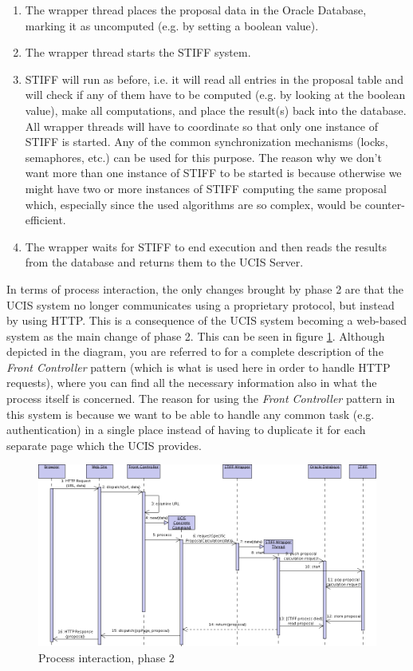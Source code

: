 \begin{enumerate}
\item The wrapper thread places the proposal data in the Oracle Database, marking it as uncomputed
(e.g. by setting a boolean value).
\item The wrapper thread starts the STIFF system.
\item STIFF will run as before, i.e. it will read all entries in the proposal table and will check if any
of them have to be computed (e.g. by looking at the boolean value), make all computations, and
place the result(s) back into the database. All wrapper threads will have to coordinate so that only
one instance of STIFF is started. Any of the common synchronization mechanisms (locks, semaphores,
etc.) can be used for this purpose. The reason why we don't want more than one instance of STIFF
to be started is because otherwise we might have two or more instances of STIFF computing the same
proposal which, especially since the used algorithms are so complex, would be counter-efficient.
\item The wrapper waits for STIFF to end execution and then reads the results from the database
and returns them to the UCIS Server.
\end{enumerate}

In terms of process interaction, the only changes brought by phase 2 are that the UCIS system no
longer communicates using a proprietary protocol, but instead by using HTTP. This is a consequence
of the UCIS system becoming a web-based system as the main change of phase 2. This can be seen
in figure \ref{fig:pi_2}. Although depicted in the diagram, you are referred to \cite{fow03} for a
complete description of the \textit{Front Controller} pattern (which is what is used here in order to handle
HTTP requests), where you can find all the necessary information also in what the process itself is
concerned. The reason for using the \textit{Front Controller} pattern in this system is because we want to
be able to handle any common task (e.g. authentication) in a single place instead of having to duplicate
it for each separate page which the UCIS provides.

\begin{figure}[ht]
\begin{center}
\includegraphics[width=\linewidth]{img/pi_2.png}
\end{center}
\caption{Process interaction, phase 2}
\label{fig:pi_2}
\end{figure}

